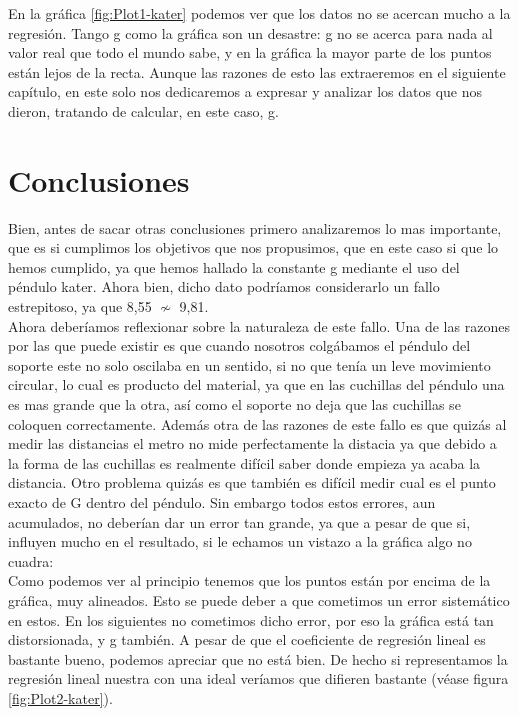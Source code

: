 \documentclass[12pt,a4paper]{book}
\begin{document}
En la gráfica \ref{fig:Plot1-kater} podemos ver que los datos no se acercan mucho a la regresión. Tango g como la gráfica son un desastre: g no se acerca para nada al valor real que todo el mundo sabe, y en la gráfica la mayor parte de los puntos están lejos de la recta. Aunque las razones de esto las extraeremos en el siguiente capítulo, en este solo nos dedicaremos a expresar y analizar los datos que nos dieron, tratando de calcular, en este caso, g.

\section{Conclusiones}

Bien, antes de sacar otras conclusiones primero analizaremos lo mas importante, que es si cumplimos los objetivos que nos propusimos, que en este caso si que lo hemos cumplido, ya que hemos hallado la constante g mediante el uso del péndulo kater. Ahora bien, dicho dato podríamos considerarlo un fallo estrepitoso, ya que 8,55 $\nsim$ 9,81. \\

Ahora deberíamos reflexionar sobre la naturaleza de este fallo. Una de las razones por las que puede existir es que cuando nosotros colgábamos el péndulo del soporte este no solo oscilaba en un sentido, si no que tenía un leve movimiento circular, lo cual es producto del material, ya que en las cuchillas del péndulo una es mas grande que la otra, así como el soporte no deja que las cuchillas se coloquen correctamente. Además otra de las razones de este fallo es que quizás al medir las distancias el metro no mide perfectamente la distacia ya que debido a la forma de las cuchillas es realmente difícil saber donde empieza ya acaba la distancia. Otro problema quizás es que también es difícil medir cual es el punto exacto de G dentro del péndulo. Sin embargo todos estos errores, aun acumulados, no deberían dar un error tan grande, ya que a pesar de que si, influyen mucho en el resultado, si le echamos un vistazo a la gráfica algo no cuadra: \\

Como podemos ver al principio tenemos que los puntos están por encima de la gráfica, muy alineados. Esto se puede deber a que cometimos un error sistemático en estos. En los siguientes no cometimos dicho error, por eso la gráfica está tan distorsionada, y g también. A pesar de que el coeficiente de regresión lineal es bastante bueno, podemos apreciar que no está bien. De hecho si representamos la regresión lineal nuestra con una ideal veríamos que difieren bastante (véase figura \ref{fig:Plot2-kater}). \\
\end{document}
